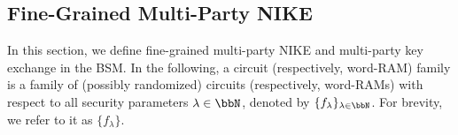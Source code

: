 






\subsection{Fine-Grained Multi-Party NIKE}
\label{def:munike}
In this section, we define fine-grained multi-party NIKE and multi-party key exchange in the BSM. In the following, 
a circuit (respectively, word-RAM) family is a family of (possibly randomized) circuits (respectively, word-RAMs) with respect to all security parameters $\lambda\in\N$, denoted by $\{f_{\lambda}\}_{\lambda\in\N}$. For brevity, we refer to it as $\{f_{\lambda}\}$.

